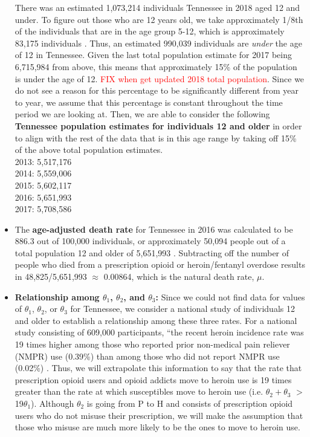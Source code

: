 \documentclass[12pt]{article}
\begin{document}
\begin{itemize}
There was an estimated 1,073,214 individuals Tennessee in 2018 aged 12 and under. To figure out those who are 12 years old, we take approximately 1/8th of the individuals that are in the age group 5-12, which is approximately 83,175 individuals \cite{DOHHS}. Thus, an estimated 990,039 individuals are \emph{under} the age of 12 in Tennessee. Given the last total population estimate for 2017 being 6,715,984 from above, this means that approximately 15\% of the population is under the age of 12. \textcolor{red}{FIX when get updated 2018 total population}. Since we do not see a reason for this percentage to be significantly different from year to year, we assume that this percentage is constant throughout the time period we are looking at. Then, we are able to consider the following \textbf{Tennessee population estimates for individuals 12 and older} in order to align with the rest of the data that is in this age range by taking off 15\% of the above total population estimates.  \\
2013: 5,517,176 \\
2014: 5,559,006 \\
2015: 5,602,117 \\
2016: 5,651,993 \\
2017: 5,708,586 \\

\item The \textbf{age-adjusted death rate} for Tennessee in 2016 was calculated to be 886.3 out of 100,000 individuals, or approximately 50,094 people out of a total population 12 and older of 5,651,993 \cite{Kaiser}. Subtracting off the number of people who died from a prescription opioid or heroin/fentanyl overdose results in 48,825/5,651,993 $\approx$ 0.00864, which is the natural death rate, $\mu$.



\item \textbf{Relationship among $\theta_1$, $\theta_2$, and $\theta_3$:} Since we could not find data for values of $\theta_1$, $\theta_2$, or $\theta_3$ for Tennessee, we consider a national study of individuals 12 and older to establish a relationship among these three rates. For a national study consisting of 609,000 participants, ``the recent heroin incidence rate was 19 times higher among those who reported prior non-medical pain reliever (NMPR) use (0.39\%) than among those who did not report NMPR use (0.02\%) \cite{Muhuri}.
Thus, we will extrapolate this information to say that the rate that prescription opioid users and opioid addicts move to heroin use is 19 times greater than the rate at which susceptibles move to heroin use (i.e. $\theta_2 + \theta_3$ $>$ 19$\theta_1$). Although $\theta_2$ is going from P to H and consists of prescription opioid users who do not misuse their prescription, we will make the assumption that those who misuse are much more likely to be the ones to move to heroin use. \\


\end{itemize}
\end{document}
